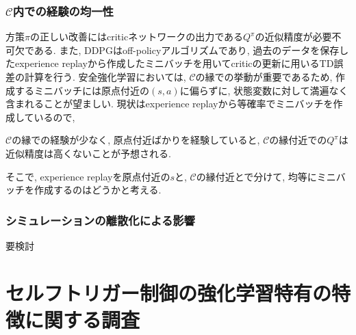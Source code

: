 \documentclass{jsarticle}
\begin{document}
\subsubsection{$\mathcal{C}$内での経験の均一性}
方策$\pi$の正しい改善にはcriticネットワークの出力である$Q^{\pi}$の近似精度が必要不可欠である. また, DDPGはoff-policyアルゴリズムであり, 過去のデータを保存したexperience replayから作成したミニバッチを用いてcriticの更新に用いるTD誤差の計算を行う. 安全強化学習においては, $\mathcal{C}$の縁での挙動が重要であるため, 作成するミニバッチには原点付近の$(s,a)$に偏らずに, 状態変数に対して満遍なく含まれることが望ましい. 現状はexperience replayから等確率でミニバッチを作成しているので, {$\mathcal{C}$の縁での経験が少なく, 原点付近ばかりを経験していると, $\mathcal{C}$の縁付近での$Q^{\pi}$は近似精度は高くないことが予想される. \par
そこで, experience replayを原点付近の$s$と, $\mathcal{C}$の縁付近とで分けて, 均等にミニバッチを作成するのはどうかと考える. %

\subsubsection{シミュレーションの離散化による影響}
要検討

\section{セルフトリガー制御の強化学習特有の特徴に関する調査}
}
\end{document}
